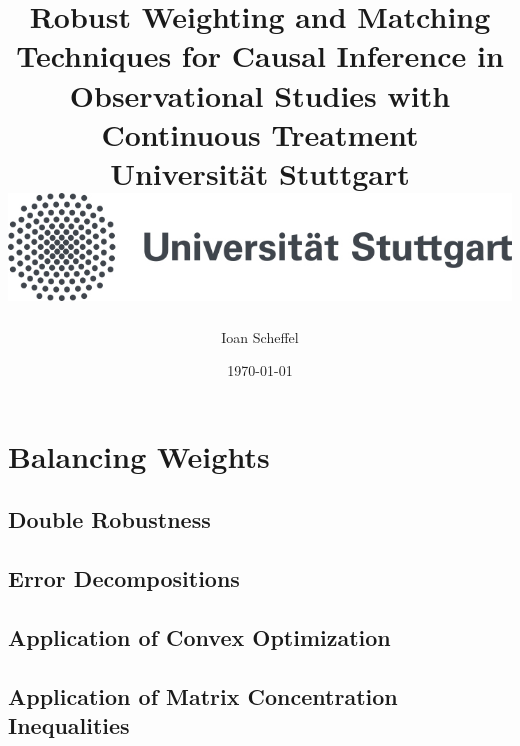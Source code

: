 \documentclass[11pt, a4paper, BCOR=10mm, DIV=9]{scrbook}
\title{
  {
    Robust Weighting and Matching Techniques for Causal Inference in Observational Studies with Continuous Treatment
  }
  \\
  {\large Universität Stuttgart}
  \\
  {\includegraphics{unistuttgart_logo_deutsch.jpg}}
}
\author{Ioan Scheffel}
\date{\today}
\theoremstyle{definition}
\theoremstyle{plain}
\begin{document}
\listoftodos

\maketitle

\tableofcontents 

%
%

\chapter{Balancing Weights}
  \section{Double Robustness}
  
  \section{Error Decompositions}
  
  \section{Application of Convex Optimization}
  
  \section{Application of Matrix Concentration Inequalities}
  
\end{document}
